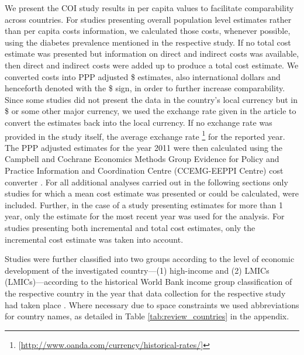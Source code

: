 We present the \ac{COI} study results in per capita values to facilitate comparability across countries. For studies presenting overall population level estimates rather than per capita costs information, we calculated those costs, whenever possible, using the diabetes prevalence mentioned in the respective study. If no total cost estimate was presented but information on direct and indirect costs was available, then direct and indirect costs were added up to produce a total cost estimate. We converted costs into \ac{PPP} adjusted \DIFaddbegin {}\$ \DIFaddend estimates, also \DIFdelbegin {}\DIFdelend \DIFaddbegin {}\DIFaddend international dollars and henceforth denoted with the \$ sign, in order to further increase comparability. Since some studies did not present the data in the country's local currency but in \DIFdelbegin {}\DIFdelend \DIFaddbegin {}\DIFaddend \$ or some other major currency, we used the exchange rate given in the article to convert the estimates back into the local currency. If no exchange rate was provided in the study itself, \DIFaddbegin {}\DIFaddend the average exchange rate\DIFdelbegin {}%
\DIFdel{) }\DIFdelend \DIFaddbegin \footnote{[\url{http://www.oanda.com/currency/historical-rates/}]} \DIFaddend for the reported year. The \ac{PPP} adjusted estimates for the year 2011 were then calculated using the Campbell and Cochrane Economics Methods Group Evidence for Policy and Practice Information and Coordination Centre (CCEMG-EEPPI Centre) cost converter \parencite{Shemilt2010}. For all additional analyses carried out in the following sections only studies for which a mean cost estimate was presented or could be calculated, were included. Further, in the case of a study presenting estimates for more than 1 year, only the estimate for the most recent year was used for the analysis. For studies presenting both incremental and total cost estimates, only the incremental cost estimate was taken into account.

Studies were further classified into two groups according to the level of economic development of the investigated country---(1) high-income and (2) \acp{LMIC} (\acp{LMIC})---according to the historical World Bank income group classification of the respective country in the year that data collection for the respective study had taken place \parencite{WorldBank}. Where necessary due to space constraints we used abbreviations for country names, as detailed in Table \ref{tab:review_countries} in the appendix.

